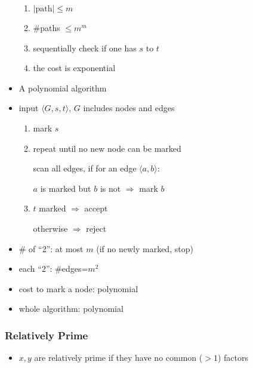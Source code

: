 \begin{frame}[allowframebreaks]
\begin{itemize}
\begin{enumerate}
  \item $|\text{path}|\leq m$

  \item \#paths $\leq m^m$

  \item sequentially check if one has $s$ to $t$

  \item the cost is exponential
\end{enumerate}
\item A polynomial algorithm

\item [] input $\langle  G,s,t\rangle $, $G$ includes nodes and edges
\begin{enumerate}
\item mark $s$


\item repeat until no new node can be marked

  \quad scan all edges, if for an edge $\langle  a,b\rangle $:
  \begin{center}
  $a$ is marked but $b$ is not
$\Rightarrow $ mark $b$
\end{center}
\item $t$ marked $\Rightarrow$ accept

otherwise $\Rightarrow$ reject
\end{enumerate}
\item \# of ``2'': at most $m$ (if no newly marked, stop)
\item each ``2'': \#edges=$m^2$
\item cost to mark a node: polynomial
\item whole algorithm: polynomial
\end{itemize}\end{frame} \begin{frame}[allowframebreaks] \frametitle{Relatively Prime}
  \begin{itemize}
\item $x,y$ are relatively prime if they have no common ($> 1$) factors


\end{itemize}
\end{frame}
